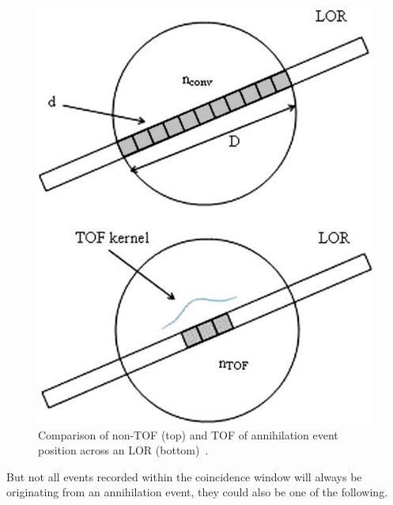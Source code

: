 \begin{figure} [h!]
\centering
\includegraphics[scale=0.55,angle=0]{2_Theory_Methods/figures/TOF_bin.png}
\caption{Comparison of non-TOF (top) and TOF of annihilation event position across an LOR (bottom)~\cite{Conti2009}.} 
\label{fig_2:TOF_bin}
\end{figure} 
%
But not all events recorded within the coincidence window will always be originating from an annihilation event, they could also be one of the following. 
%
